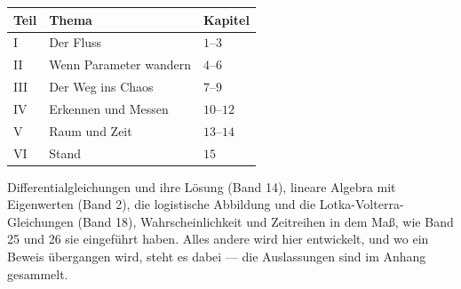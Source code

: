 \begin{merksatz}
\begin{center}
{\small
\renewcommand{\arraystretch}{1.5}
\begin{tabular}{@{}P{1.4cm}P{3.6cm}P{3.0cm}@{}}
\toprule
\textbf{Teil} & \textbf{Thema} & \textbf{Kapitel}\\
\midrule
I & Der Fluss & $1$--$3$\\
II & Wenn Parameter wandern & $4$--$6$\\
III & Der Weg ins Chaos & $7$--$9$\\
IV & Erkennen und Messen & $10$--$12$\\
V & Raum und Zeit & $13$--$14$\\
VI & Stand & $15$\\
\bottomrule
\end{tabular}}
\end{center}

Differentialgleichungen und ihre Lösung (Band 14), lineare Algebra mit Eigenwerten (Band 2), die logistische Abbildung und die Lotka-Volterra-Gleichungen (Band 18), Wahrscheinlichkeit und Zeitreihen in dem Maß, wie Band 25 und 26 sie eingeführt haben. Alles andere wird hier entwickelt, und wo ein Beweis übergangen wird, steht es dabei --- die Auslassungen sind im Anhang gesammelt.

\begin{center}
\begin{minipage}{0.88\textwidth}
\end{minipage}
\end{center}
\end{merksatz}
